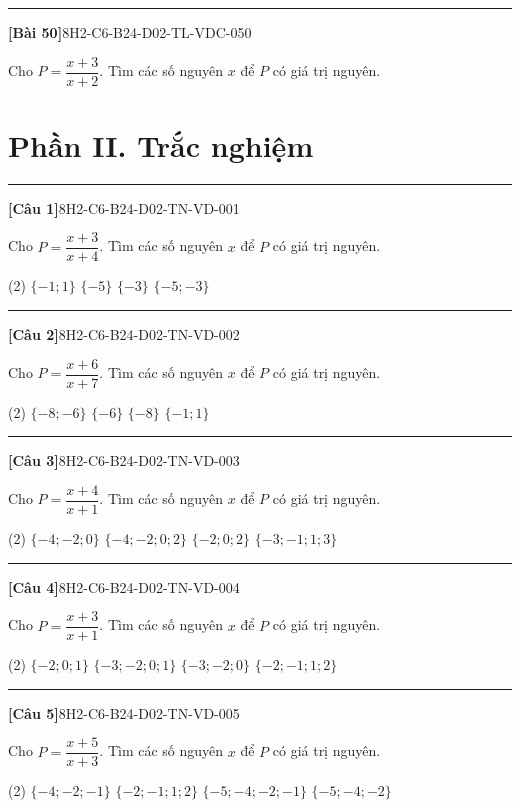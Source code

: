 \documentclass[12pt,a4paper]{article}
\newif\ifloigiai
\newenvironment{cauhoi}[2]{%
  \par\medskip\noindent\rule{\textwidth}{0.4pt}\par\nopagebreak
  \noindent\textbf{[#1]}\hfill{\scriptsize\ttfamily #2}\par\nopagebreak\smallskip}{\par}
\newcommand{\loigiai}[1]{\ifloigiai\par\smallskip\noindent\textit{Lời giải.} #1\par\fi}
\newcommand{\dapan}[1]{\ifloigiai\par\smallskip\noindent\textit{Đáp án:} \textbf{#1}\par\fi}
\begin{document}
\begin{cauhoi}{Bài 50}{8H2-C6-B24-D02-TL-VDC-050}
Cho $P=\dfrac{x+3}{x+2}$. Tìm các số nguyên $x$ để $P$ có giá trị nguyên.
\loigiai{Viết $P=\dfrac{(x+2)+1}{x+2}=1+\dfrac{1}{x+2}$. $P$ nguyên khi $x+2$ là ước của $1$, tức $x+2\in\{-1; 1\}$. Suy ra $x\in\{-3; -1\}$.}
\end{cauhoi}
\clearpage\section*{Phần II. Trắc nghiệm}
\begin{cauhoi}{Câu 1}{8H2-C6-B24-D02-TN-VD-001}
Cho $P=\dfrac{x+3}{x+4}$. Tìm các số nguyên $x$ để $P$ có giá trị nguyên.
\begin{tasks}(2)
\task $\{-1; 1\}$
\task $\{-5\}$
\task $\{-3\}$
\task $\{-5; -3\}$
\end{tasks}
\dapan{D}
\end{cauhoi}
\begin{cauhoi}{Câu 2}{8H2-C6-B24-D02-TN-VD-002}
Cho $P=\dfrac{x+6}{x+7}$. Tìm các số nguyên $x$ để $P$ có giá trị nguyên.
\begin{tasks}(2)
\task $\{-8; -6\}$
\task $\{-6\}$
\task $\{-8\}$
\task $\{-1; 1\}$
\end{tasks}
\dapan{A}
\end{cauhoi}
\begin{cauhoi}{Câu 3}{8H2-C6-B24-D02-TN-VD-003}
Cho $P=\dfrac{x+4}{x+1}$. Tìm các số nguyên $x$ để $P$ có giá trị nguyên.
\begin{tasks}(2)
\task $\{-4; -2; 0\}$
\task $\{-4; -2; 0; 2\}$
\task $\{-2; 0; 2\}$
\task $\{-3; -1; 1; 3\}$
\end{tasks}
\dapan{B}
\end{cauhoi}
\begin{cauhoi}{Câu 4}{8H2-C6-B24-D02-TN-VD-004}
Cho $P=\dfrac{x+3}{x+1}$. Tìm các số nguyên $x$ để $P$ có giá trị nguyên.
\begin{tasks}(2)
\task $\{-2; 0; 1\}$
\task $\{-3; -2; 0; 1\}$
\task $\{-3; -2; 0\}$
\task $\{-2; -1; 1; 2\}$
\end{tasks}
\dapan{B}
\end{cauhoi}
\begin{cauhoi}{Câu 5}{8H2-C6-B24-D02-TN-VD-005}
Cho $P=\dfrac{x+5}{x+3}$. Tìm các số nguyên $x$ để $P$ có giá trị nguyên.
\begin{tasks}(2)
\task $\{-4; -2; -1\}$
\task $\{-2; -1; 1; 2\}$
\task $\{-5; -4; -2; -1\}$
\task $\{-5; -4; -2\}$
\end{tasks}
\dapan{C}
\end{cauhoi}
\end{document}
